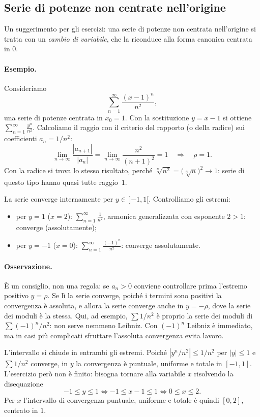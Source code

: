 \subsection{Serie di potenze non centrate nell'origine}

Un suggerimento per gli esercizi: una serie di potenze non centrata nell'origine si tratta con un
\emph{cambio di variabile}, che la riconduce alla forma canonica centrata in $0$.

\paragraph{Esempio.}
Consideriamo
\[
  \sum_{n=1}^{\infty} \frac{(x-1)^n}{n^2} ,
\]
una serie di potenze centrata in $x_0=1$. Con la sostituzione $y = x-1$ si ottiene $\sum_{n=1}^{\infty}
\frac{y^n}{n^2}$. Calcoliamo il raggio con il criterio del rapporto (o della radice) sui coefficienti
$a_n = 1/n^2$:
\[
  \lim_{n\to\infty} \frac{|a_{n+1}|}{|a_n|} = \lim_{n\to\infty} \frac{n^2}{(n+1)^2} = 1
  \quad\Longrightarrow\quad \rho = 1 .
\]
Con la radice si trova lo stesso risultato, perché $\sqrt[n]{n^2} = \bigl(\sqrt[n]{n}\bigr)^2 \to 1$: serie di
questo tipo hanno quasi tutte raggio~$1$.

La serie converge internamente per $y\in\,]{-1},1[$. Controlliamo gli estremi:
\begin{itemize}
  \item per $y=1$ ($x=2$): $\displaystyle\sum_{n=1}^{\infty} \frac{1}{n^2}$, armonica generalizzata con
        esponente $2>1$: converge (assolutamente);
  \item per $y=-1$ ($x=0$): $\displaystyle\sum_{n=1}^{\infty} \frac{(-1)^n}{n^2}$: converge assolutamente.
\end{itemize}

\paragraph{Osservazione.}
È un consiglio, non una regola: se $a_n>0$ conviene controllare prima l'estremo positivo $y=\rho$. Se lì la serie
converge, poiché i termini sono positivi la convergenza è assoluta, e allora la serie converge anche in
$y=-\rho$, dove la serie dei moduli è la stessa. Qui, ad esempio, $\sum 1/n^2$ è proprio la serie dei moduli di
$\sum (-1)^n/n^2$: non serve nemmeno Leibniz. Con $(-1)^n$ Leibniz è immediato, ma in casi più complicati sfruttare
l'assoluta convergenza evita lavoro.

L'intervallo si chiude in entrambi gli estremi. Poiché $|y^n/n^2| \le 1/n^2$ per $|y|\le 1$ e
$\sum 1/n^2$ converge, in $y$ la convergenza è puntuale, uniforme e totale in $[-1,1]$.
L'esercizio però non è finito: bisogna tornare alla variabile $x$ risolvendo la disequazione
\[
  -1 \le y \le 1 \iff -1 \le x-1 \le 1 \iff 0 \le x \le 2 .
\]
Per $x$ l'intervallo di convergenza puntuale, uniforme e totale è quindi $[0,2]$, centrato in $1$.

